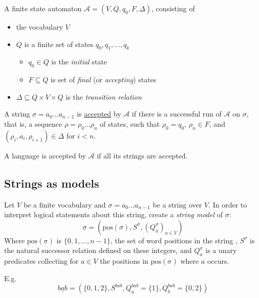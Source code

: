 \documentclass{beamer}
\begin{document}
\begin{frame}
A finite state automaton $\mathcal A=(V,Q,q_0,F,\Delta)$, consisting of
\begin{itemize}
\item the vocabulary $V$
\item $Q$ is a finite set of states $q_0,q_1,\dots,q_k$
	\begin{itemize}
	\item $q_0\in Q$ is the \emph{initial} state 
	\item $F\subseteq Q$ is set of \emph{final} (or \emph{accepting}) states
	\end{itemize}
\item $\Delta\subseteq Q\times V\times Q$ is the \emph{transition relation} 
\end{itemize}
\pause
A string $\sigma=a_0\dots a_{n-1}$ is \underline{accepted} by $\mathcal A$ if there is a successful run of $\mathcal A$ on $\sigma$, that is, a sequence $\rho=\rho_0\dots\rho_n$ of states, such that $\rho_0=q_0$, $\rho_n\in F$, and $(\rho_i,a_i,\rho_{i+1})\in \Delta$ for $i<n$.
\begin{center}
\end{center}
A language is accepted by $\mathcal A$ if all its strings are accepted.
\end{frame}

\subsection{Strings as models}
\begin{frame}
Let $V$ be a finite vocabulary and $\sigma = a_0\dots a_{n-1}$ be a string over $V$.  In order to interpret logical statements about this string, create a \emph{string model} of $\sigma$: 
\begin{equation}
\underline{\sigma} = (\mathrm{pos}(\sigma), S^\sigma, (Q^\sigma_a)_{a\in V})
\end{equation}
Where $\mathrm{pos(\sigma)}$ is $\{0,1,\dots,n-1\}$, the set of word positions in the string , $S^\sigma$ is the natural successor relation defined on these integers, and $Q_a^\sigma$ is a unary predicates collecting for $a\in V$ the positions in $\mathrm{pos(\sigma)}$ where $a$ occurs.
\pause

E.g. 
\begin{equation*}
\underline{bab} = (\{0,1,2\}, S^{bab}, Q^{bab}_a =\{1\}, Q^{bab}_b = \{0,2\})
\end{equation*}
\end{frame}
\end{document}
